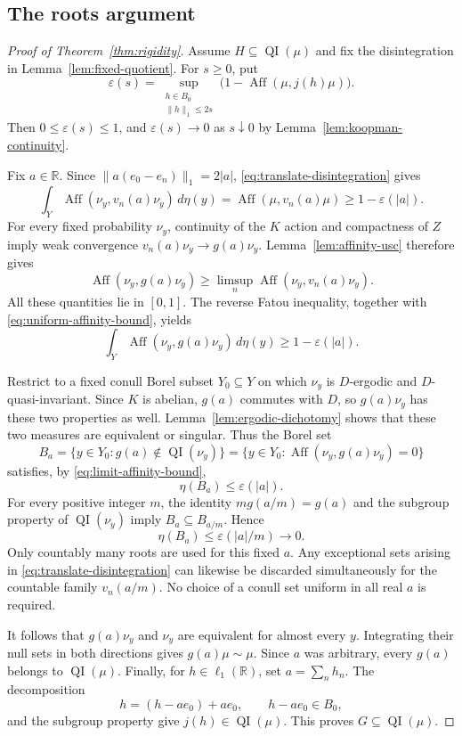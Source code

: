 \documentclass[11pt]{article}
\theoremstyle{definition}
\newcommand{\R}{\mathbb R}
\newcommand{\Aff}{\operatorname{Aff}}
\newcommand{\QI}{\operatorname{QI}}
\begin{document}
\subsection{The roots argument}

\begin{proof}[Proof of Theorem~\ref{thm:rigidity}]
Assume $H\subseteq\QI(\mu)$ and fix the disintegration in
Lemma~\ref{lem:fixed-quotient}. For $s\geq0$, put
\[
 \varepsilon(s)=
 \sup_{\substack{h\in B_0\\\|h\|_1\leq2s}}
       \bigl(1-\Aff(\mu,j(h)\mu)\bigr).
\]
Then $0\leq\varepsilon(s)\leq1$, and
$\varepsilon(s)\to0$ as $s\downarrow0$ by
Lemma~\ref{lem:koopman-continuity}.

Fix $a\in\R$. Since $\|a(e_0-e_n)\|_1=2|a|$,
\eqref{eq:translate-disintegration} gives
\begin{equation}\label{eq:uniform-affinity-bound}
 \int_Y\Aff(\nu_y,v_n(a)\nu_y)\,d\eta(y)
 =\Aff(\mu,v_n(a)\mu)\geq1-\varepsilon(|a|).
\end{equation}
For every fixed probability $\nu_y$, continuity of the $K$ action and
compactness of $Z$ imply weak convergence
$v_n(a)\nu_y\to g(a)\nu_y$. Lemma~\ref{lem:affinity-usc} therefore
gives
\[
 \Aff(\nu_y,g(a)\nu_y)
 \geq\limsup_n\Aff(\nu_y,v_n(a)\nu_y).
\]
All these quantities lie in $[0,1]$. The reverse Fatou inequality,
together with \eqref{eq:uniform-affinity-bound}, yields
\begin{equation}\label{eq:limit-affinity-bound}
 \int_Y\Aff(\nu_y,g(a)\nu_y)\,d\eta(y)
 \geq1-\varepsilon(|a|).
\end{equation}

Restrict to a fixed conull Borel subset $Y_0\subseteq Y$ on which
$\nu_y$ is $D$-ergodic and $D$-quasi-invariant. Since $K$ is abelian,
$g(a)$ commutes with $D$, so $g(a)\nu_y$ has these two properties as
well. Lemma~\ref{lem:ergodic-dichotomy} shows that these two measures
are equivalent or singular. Thus the Borel set
\[
 B_a=\{y\in Y_0:g(a)\notin\QI(\nu_y)\}
     =\{y\in Y_0:\Aff(\nu_y,g(a)\nu_y)=0\}
\]
satisfies, by \eqref{eq:limit-affinity-bound},
\[
 \eta(B_a)\leq\varepsilon(|a|).
\]
For every positive integer $m$, the identity $m g(a/m)=g(a)$ and the
subgroup property of $\QI(\nu_y)$ imply
$B_a\subseteq B_{a/m}$. Hence
\[
 \eta(B_a)\leq\varepsilon(|a|/m)\longrightarrow0.
\]
Only countably many roots are used for this fixed $a$. Any exceptional
sets arising in \eqref{eq:translate-disintegration} can likewise be
discarded simultaneously for the
countable family $v_n(a/m)$. No choice of a conull set uniform in all
real $a$ is required.

It follows that $g(a)\nu_y$ and $\nu_y$ are equivalent for almost
every $y$. Integrating their null sets in both directions gives
$g(a)\mu\sim\mu$. Since $a$ was arbitrary, every $g(a)$ belongs to
$\QI(\mu)$. Finally, for $h\in\ell_1(\R)$, set
$a=\sum_nh_n$. The decomposition
\[
 h=(h-ae_0)+ae_0,
 \qquad h-ae_0\in B_0,
\]
and the subgroup property give $j(h)\in\QI(\mu)$. This proves
$G\subseteq\QI(\mu)$.
\end{proof}
\end{document}
